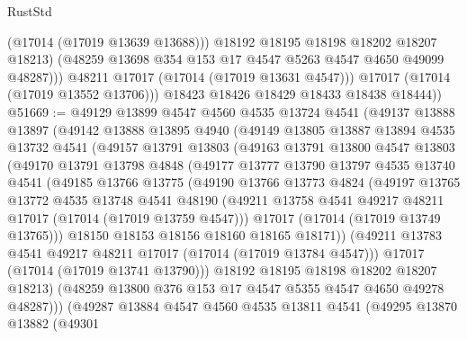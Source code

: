 \begin{lexlean}{RustStd}
\begin{coremodule}
                    (@17014 (@17019 @13639 @13688)))
                  @18192
                  @18195
                  @18198
                  @18202
                  @18207
                  @18213)
                (@48259 @13698 @354 @153 @17 @4547 @5263 @4547 @4650 @49099 @48287)))
            @48211
            @17017
            (@17014 (@17019 @13631 @4547)))
          @17017
          (@17014 (@17019 @13552 @13706)))
        @18423
        @18426
        @18429
        @18433
        @18438
        @18444))
@51669 := @49129
    @13899
    @4547
    @4560
    @4535
    @13724
    @4541
    (@49137
      @13888
      @13897
      (@49142
        @13888
        @13895
        @4940
        (@49149
          @13805
          @13887
          @13894
          @4535
          @13732
          @4541
          (@49157
            @13791
            @13803
            (@49163
              @13791
              @13800
              @4547
              @13803
              (@49170
                @13791
                @13798
                @4848
                (@49177
                  @13777
                  @13790
                  @13797
                  @4535
                  @13740
                  @4541
                  (@49185
                    @13766
                    @13775
                    (@49190
                      @13766
                      @13773
                      @4824
                      (@49197
                        @13765
                        @13772
                        @4535
                        @13748
                        @4541
                        @48190
                        (@49211 @13758 @4541 @49217 @48211 @17017 (@17014 (@17019 @13759 @4547)))
                        @17017
                        (@17014 (@17019 @13749 @13765)))
                      @18150
                      @18153
                      @18156
                      @18160
                      @18165
                      @18171))
                  (@49211 @13783 @4541 @49217 @48211 @17017 (@17014 (@17019 @13784 @4547)))
                  @17017
                  (@17014 (@17019 @13741 @13790)))
                @18192
                @18195
                @18198
                @18202
                @18207
                @18213)
              (@48259 @13800 @376 @153 @17 @4547 @5355 @4547 @4650 @49278 @48287)))
          (@49287
            @13884
            @4547
            @4560
            @4535
            @13811
            @4541
            (@49295
              @13870
              @13882
              (@49301

\end{coremodule}
\end{lexlean}
